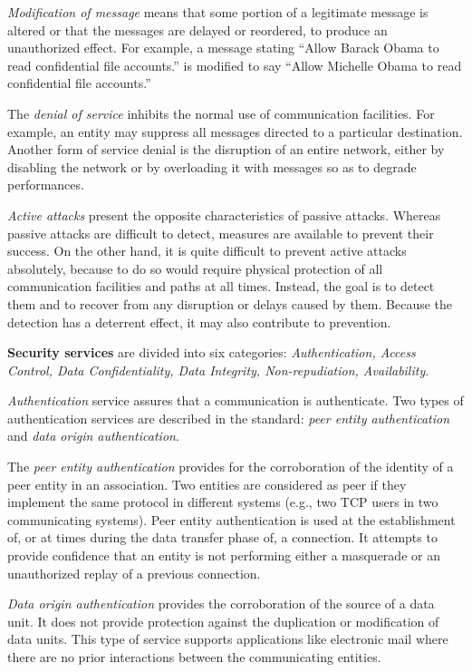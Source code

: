 	\textit{Modification of message} means that some portion of a legitimate message is altered or that the messages are delayed or reordered, to produce an unauthorized effect.
	For example, a message stating ``Allow Barack Obama to read confidential file accounts.'' is modified to say ``Allow Michelle Obama to read confidential file accounts.''

	The \textit{denial of service} inhibits the normal use of communication facilities.
	For example, an entity may suppress all messages directed to a particular destination.
	Another form of service denial is the disruption of an entire network, either by disabling the network or by overloading it with messages so as to degrade performances.

	\textit{Active attacks} present the opposite characteristics of passive attacks.
	Whereas passive attacks are difficult to detect, measures are available to prevent their success.
	On the other hand, it is quite difficult to prevent active attacks absolutely, because to do so would require physical protection of all communication facilities and paths at all times.
	Instead, the goal is to detect them and to recover from any disruption or delays caused by them.
	Because the detection has a deterrent effect, it may also contribute to prevention.

	\textbf{Security services} are divided into six categories:
	\textit{Authentication, Access Control, Data Confidentiality, Data Integrity, Non-repudiation, Availability}.

	\textit{Authentication} service assures that a communication is authenticate.
	Two types of authentication services are described in the standard: \textit{peer entity authentication} and \textit{data origin authentication}.

	The \textit{peer entity authentication} provides for the corroboration of the identity of a peer entity in an association.
	Two entities are considered as peer if they implement the same protocol in different systems (e.g., two TCP users in two communicating systems).
	Peer entity authentication is used at the establishment of, or at times during the data transfer phase of, a connection.
	It attempts to provide confidence that an entity is not performing either a masquerade or an unauthorized replay of a previous connection.

	\textit{Data origin authentication} provides the corroboration of the source of a data unit. 
	It does not provide protection against the duplication or modification of data units.
	This type of service supports applications like electronic mail where there are no prior interactions between the communicating entities.

